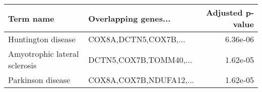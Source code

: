 \begin{tabular}{llr}
\toprule
                    Term name &    Overlapping genes... &  Adjusted p-value \\
\midrule
           Huntington disease &   COX8A,DCTN5,COX7B,... &          6.36e-06 \\
Amyotrophic lateral sclerosis &  DCTN5,COX7B,TOMM40,... &          1.62e-05 \\
            Parkinson disease & COX8A,COX7B,NDUFA12,... &          1.62e-05 \\
\bottomrule
\end{tabular}
